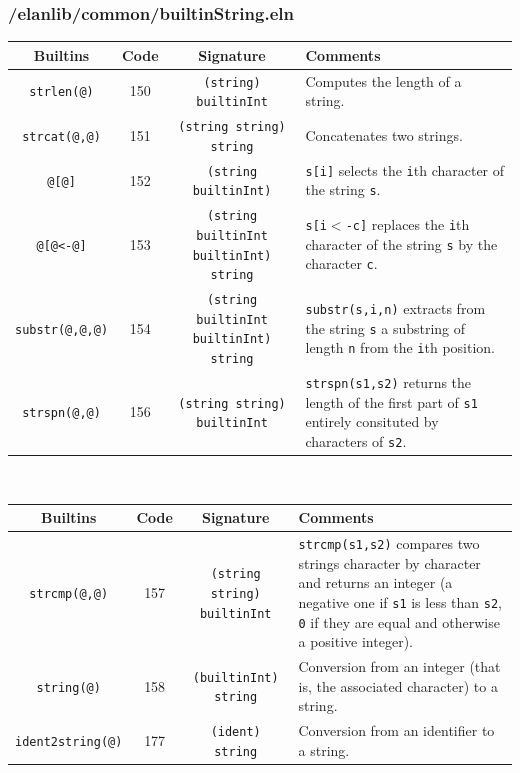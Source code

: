 \subsubsection{/elanlib/common/builtinString.eln}


\begin{tabular}{|c|c|c|p{4cm}|}
\hline
{\bf Builtins} & {\bf Code} & {\bf Signature} & {\bf Comments} \\
\hline
\hline
{\tt strlen(@)}         & 150 & {\tt (string) builtinInt} & Computes the length of a string.\\
{\tt strcat(@,@)}       & 151 & {\tt (string string) string} & Concatenates two strings.\\
{\tt @[@]}              & 152 & {\tt (string builtinInt)}  & {\tt s[i]} selects the {\tt i}th character of the string {\tt s}.\\
{\tt @[@<-@]}           & 153 & {\tt (string builtinInt builtinInt) string} & {\tt s[i$<$-c]} replaces the {\tt i}th character of the string {\tt s} by the character {\tt c}.\\
{\tt substr(@,@,@)}     & 154 & {\tt (string builtinInt builtinInt) string} & {\tt substr(s,i,n)} extracts from the string {\tt s} a substring of length {\tt n} from the {\tt i}th position.\\
{\tt strspn(@,@)}       & 156 & {\tt (string string) builtinInt} & {\tt strspn(s1,s2)} returns the length of the first part of {\tt s1} entirely consituted by characters of {\tt s2}.\\
\hline
\end{tabular}
~\\
\begin{tabular}{|c|c|c|p{}|}
\hline
{\bf Builtins} & {\bf Code} & {\bf Signature} & {\bf Comments} \\
\hline
\hline
{\tt strcmp(@,@)}       & 157 & {\tt (string string) builtinInt} & {\tt strcmp(s1,s2)} compares two strings character by character and returns an integer (a negative one if {\tt s1} is less than {\tt s2}, {\tt 0} if they are equal and otherwise a positive integer).\\
{\tt string(@)}         & 158 & {\tt (builtinInt) string} & Conversion from an integer (that is, the associated character) to a string.\\
{\tt ident2string(@)}   & 177 & {\tt (ident) string} & Conversion from an identifier to a string.\\
\hline
\end{tabular}


